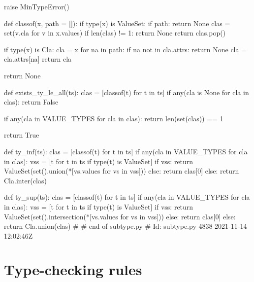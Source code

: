 \begin{dispPy}
    raise MinTypeError()

def classof(x, path = []):
    if type(x) is ValueSet:
        if path:
            return None
        clas = set(v.cla for v in x.values)
        if len(clas) != 1:
            return None
        return clas.pop()

    if type(x) is Cla:
        cla = x
        for na in path:
            if na not in cla.attrs:
                return None
            cla = cla.attrs[na]
        return cla

    return None

def exists_ty_le_all(ts):
    clas = [classof(t) for t in ts]
    if any(cla is None for cla in clas):
        return False

    if any(cla in VALUE_TYPES for cla in clas):
        return len(set(clas)) == 1

    return True

def ty_inf(ts):
    clas = [classof(t) for t in ts]
    if any(cla in VALUE_TYPES for cla in clas):
        vss = [t for t in ts if type(t) is ValueSet]
        if vss:
            return ValueSet(set().union(*[vs.values for vs in vss]))
        else:
            return clas[0]
    else:
        return Cla.inter(clas)

def ty_sup(ts):
    clas = [classof(t) for t in ts]
    if any(cla in VALUE_TYPES for cla in clas):
        vss = [t for t in ts if type(t) is ValueSet]
        if vss:
            return ValueSet(set().intersection(*[vs.values for vs in vss]))
        else:
            return clas[0]
    else:
        return Cla.union(clas)
#
# end of subtype.py
# Id: subtype.py 4838 2021-11-14 12:02:46Z 
\end{dispPy}

\section{Type-checking rules}

